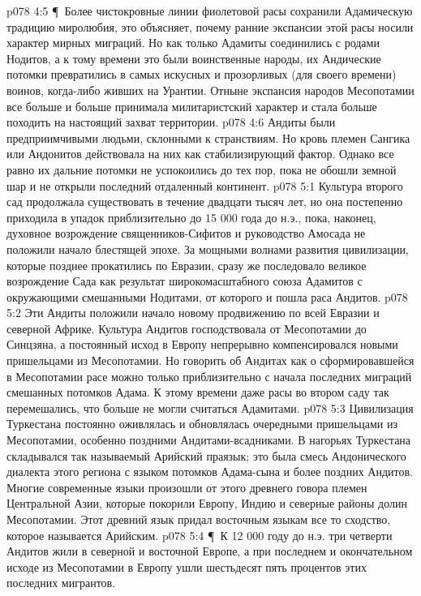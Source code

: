 \vs p078 4:5 \P\ Более чистокровные линии фиолетовой расы сохранили Адамическую традицию миролюбия, это объясняет, почему ранние экспансии этой расы носили характер мирных миграций. Но как только Адамиты соединились с родами Нодитов, а к тому времени это были воинственные народы, их Андические потомки превратились в самых искусных и прозорливых (для своего времени) воинов, когда\hyp{}либо живших на Урантии. Отныне экспансия народов Месопотамии все больше и больше принимала милитаристский характер и стала больше походить на настоящий захват территории.
\vs p078 4:6 Андиты были предприимчивыми людьми, склонными к странствиям. Но кровь племен Сангика или Андонитов действовала на них как стабилизирующий фактор. Однако все равно их дальние потомки не успокоились до тех пор, пока не обошли земной шар и не открыли последний отдаленный континент.
\vs p078 5:1 Культура второго сад продолжала существовать в течение двадцати тысяч лет, но она постепенно приходила в упадок приблизительно до 15 000 года до н.э., пока, наконец, духовное возрождение священников\hyp{}Сифитов и руководство Амосада не положили начало блестящей эпохе. За мощными волнами развития цивилизации, которые позднее прокатились по Евразии, сразу же последовало великое возрождение Сада как результат широкомасштабного союза Адамитов с окружающими смешанными Нодитами, от которого и пошла раса Андитов.
\vs p078 5:2 Эти Андиты положили начало новому продвижению по всей Евразии и северной Африке. Культура Андитов господствовала от Месопотамии до Синцзяна, а постоянный исход в Европу непрерывно компенсировался новыми пришельцами из Месопотамии. Но говорить об Андитах как о сформировавшейся в Месопотамии расе можно только приблизительно с начала последних миграций смешанных потомков Адама. К этому времени даже расы во втором саду так перемешались, что больше не могли считаться Адамитами.
\vs p078 5:3 Цивилизация Туркестана постоянно оживлялась и обновлялась очередными пришельцами из Месопотамии, особенно поздними Андитами\hyp{}всадниками. В нагорьях Туркестана складывался так называемый Арийский праязык; это была смесь Андонического диалекта этого региона с языком потомков Адама\hyp{}сына и более поздних Андитов. Многие современные языки произошли от этого древнего говора племен Центральной Азии, которые покорили Европу, Индию и северные районы долин Месопотамии. Этот древний язык придал восточным языкам все то сходство, которое называется Арийским.
\vs p078 5:4 \P\ К 12 000 году до н.э. три четверти Андитов жили в северной и восточной Европе, а при последнем и окончательном исходе из Месопотамии в Европу ушли шестьдесят пять процентов этих последних мигрантов.
